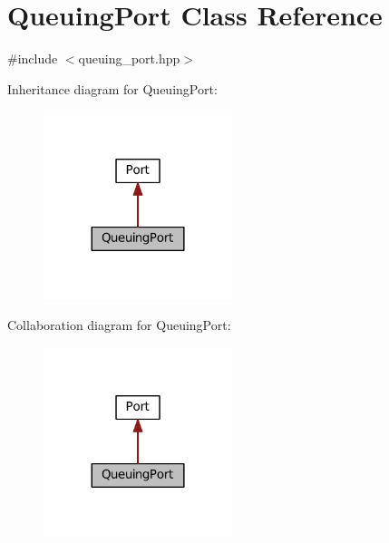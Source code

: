 \hypertarget{classQueuingPort}{}\section{Queuing\+Port Class Reference}
\label{classQueuingPort}


{\ttfamily \#include $<$queuing\+\_\+port.\+hpp$>$}



Inheritance diagram for Queuing\+Port\+:
\nopagebreak
\begin{figure}[H]
\begin{center}
\leavevmode
\includegraphics[width=156pt]{classQueuingPort__inherit__graph}
\end{center}
\end{figure}


Collaboration diagram for Queuing\+Port\+:
\nopagebreak
\begin{figure}[H]
\begin{center}
\leavevmode
\includegraphics[width=156pt]{classQueuingPort__coll__graph}
\end{center}
\end{figure}
